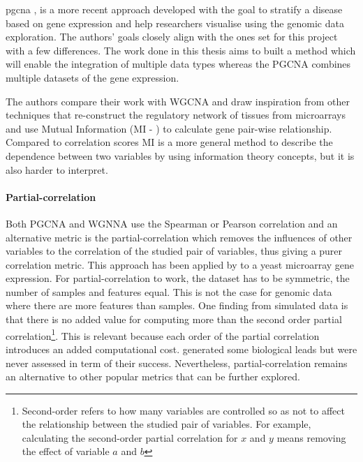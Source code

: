 \acrlong{pgcna} \citep{Care2019-ij}, is a more recent approach developed with the goal to stratify a disease based on gene expression and help researchers visualise using the genomic data exploration. The authors' goals closely align with the ones set for this project with a few differences. The work done in this thesis aims to built a method which will enable the integration of multiple data types whereas the PGCNA combines multiple datasets of the gene expression. 

The authors compare their work with WGCNA and draw inspiration from other techniques that re-construct the regulatory network of tissues from microarrays and use Mutual Information (MI - \citet{Margolin2006-mc,Zhang2013-fs}) to calculate gene pair-wise relationship. Compared to correlation scores MI is a more general method to describe the dependence between two variables by using information theory concepts, but it is also harder to interpret.


\paragraph*{Partial-correlation} \label{s:lit:partial-corr}

Both PGCNA and WGNNA use the Spearman or Pearson correlation and an alternative metric is the partial-correlation which removes the influences of other variables to the correlation of the studied pair of variables, thus giving a purer correlation metric. This approach has been applied by \citet{De_la_Fuente2004-ts} to a yeast microarray gene expression.  For partial-correlation to work, the dataset has to be symmetric, the number of samples and features equal. This is not the case for genomic data where there are more features than samples. One finding from simulated data is that there is no added value for computing more than the second order partial correlation\footnote{Second-order refers to how many variables are controlled so as not to affect the relationship between the studied pair of variables. For example, calculating the second-order partial correlation for $x$ and $y$ means removing the effect of variable $a$ and $b$}. This is relevant because each order of the partial correlation introduces an added computational cost. \citet{De_la_Fuente2004-ts} generated some biological leads but were never assessed in term of their success. Nevertheless, partial-correlation remains an alternative to other popular metrics that can be further explored.

